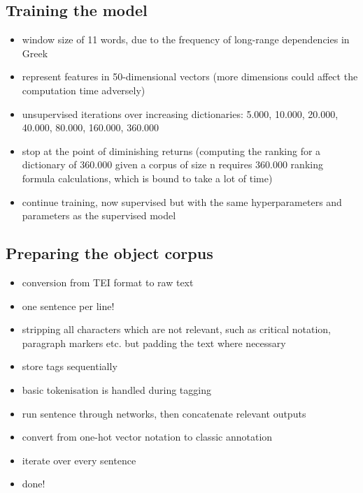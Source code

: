 \subsection{Training the model}
\label{sec:createmodel}
\begin{itemize}
\item window size of 11 words, due to the frequency of long-range dependencies in Greek
\item represent features in 50-dimensional vectors (more dimensions
  could affect the computation time adversely)
\item unsupervised iterations over increasing dictionaries: 5.000,
10.000, 20.000, 40.000, 80.000, 160.000, 360.000
\item stop at the point of diminishing returns (computing the ranking
for a dictionary of 360.000 given a corpus of size n requires 360.000
ranking formula calculations, which is bound to take a lot of time)
\item continue training, now supervised but with the same hyperparameters and parameters as the supervised model
\end{itemize}

\subsection{Preparing the object corpus}
\label{sec:createmodel}
\begin{itemize}
\item conversion from  TEI format to raw text
\item one sentence per line!
\item stripping all characters which are not relevant, such as
critical notation, paragraph markers etc. but padding the text where necessary
\item store tags sequentially
\item basic tokenisation is handled during tagging
\item run sentence through networks, then concatenate relevant outputs
\item convert from one-hot vector notation to classic annotation
\item iterate over every sentence
\item done!
\end{itemize}